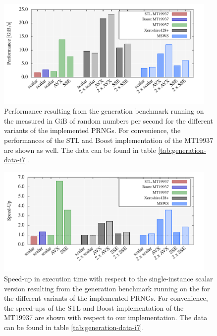 \documentclass{stdlocal}
\begin{document}
    \begin{figure}
      \center
      \includegraphics[width=0.95\textwidth]{plots/generation_desktop.pdf}
      \caption[Generation Benchmark Performance for ]{%
        Performance resulting from the generation benchmark running on the  measured in $\mathrm{GiB}$ of random numbers per second for the different variants of the implemented PRNGs.
        For convenience, the performances of the STL and Boost implementation of the MT19937 are shown as well.
        The data can be found in table \ref{tab:generation-data-i7}.
      }
      \label{fig:generation-performance-i7}
    \end{figure}

    \begin{figure}
      \center
      \includegraphics[width=0.95\textwidth]{plots/generation_desktop_speedup.pdf}
      \caption[Generation Benchmark Speed-Up for ]{%
        Speed-up in execution time with respect to the single-instance scalar version resulting from the generation benchmark running on the  for the different variants of the implemented PRNGs.
        For convenience, the speed-ups of the STL and Boost implementation of the MT19937 are shown with respect to our implementation.
        The data can be found in table \ref{tab:generation-data-i7}.
      }
      \label{fig:generation-speedup-i7}
    \end{figure}
\end{document}

